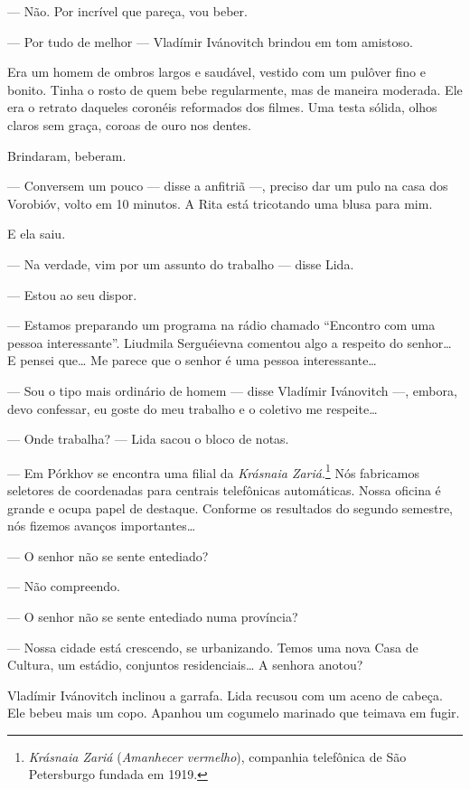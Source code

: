 --- Não. Por incrível que pareça, vou beber.

--- Por tudo de melhor --- Vladímir Ivánovitch brindou em tom amistoso.

Era um homem de ombros largos e saudável, vestido com um pulôver fino e
bonito. Tinha o rosto de quem bebe regularmente, mas de maneira
moderada. Ele era o retrato daqueles coronéis reformados dos filmes. Uma
testa sólida, olhos claros sem graça, coroas de ouro nos dentes.

Brindaram, beberam.

--- Conversem um pouco --- disse a anfitriã ---, preciso dar um pulo na
casa dos Vorobióv, volto em 10 minutos. A Rita está tricotando uma blusa
para mim.

E ela saiu.

--- Na verdade, vim por um assunto do trabalho --- disse Lida.

--- Estou ao seu dispor.

--- Estamos preparando um programa na rádio chamado ``Encontro com uma
pessoa interessante''. Liudmila Serguéievna comentou algo a respeito do
senhor\ldots{} E pensei que\ldots{} Me parece que o senhor é uma pessoa
interessante\ldots{}

--- Sou o tipo mais ordinário de homem --- disse Vladímir Ivánovitch
---, embora, devo confessar, eu goste do meu trabalho e o coletivo me
respeite\ldots{}

--- Onde trabalha? --- Lida sacou o bloco de notas.

--- Em Pórkhov se encontra uma filial da \emph{Krásnaia
Zariá}.\footnote{\emph{Krásnaia Zariá} (\emph{Amanhecer vermelho}),
  companhia telefônica de São Petersburgo fundada em 1919.} Nós
fabricamos seletores de coordenadas para centrais telefônicas
automáticas. Nossa oficina é grande e ocupa papel de destaque. Conforme
os resultados do segundo semestre, nós fizemos avanços importantes\ldots{}

--- O senhor não se sente entediado?

--- Não compreendo.

--- O senhor não se sente entediado numa província?

--- Nossa cidade está crescendo, se urbanizando. Temos uma nova Casa de
Cultura, um estádio, conjuntos residenciais\ldots{} A senhora anotou?

Vladímir Ivánovitch inclinou a garrafa. Lida recusou com um aceno de
cabeça. Ele bebeu mais um copo. Apanhou um cogumelo marinado
que teimava em fugir.

